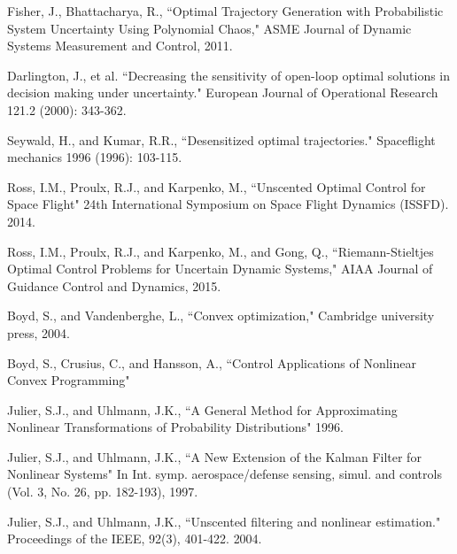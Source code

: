 \documentclass[10pt,a4paper]{article}
\begin{document}
	\begin{thebibliography}{1}
		
		
		 Fisher, J., Bhattacharya, R., ``Optimal Trajectory Generation with Probabilistic System Uncertainty Using Polynomial Chaos," ASME Journal of Dynamic Systems Measurement and Control, 2011.
		
		Darlington, J., et al. ``Decreasing the sensitivity of open-loop optimal solutions in decision making under uncertainty." European Journal of Operational Research 121.2 (2000): 343-362.
		
		Seywald, H., and Kumar, R.R., ``Desensitized optimal trajectories." Spaceflight mechanics 1996 (1996): 103-115.
		
		Ross, I.M., Proulx, R.J., and Karpenko, M., ``Unscented Optimal Control for Space Flight" 24th International Symposium on Space Flight Dynamics (ISSFD). 2014.
		
		Ross, I.M., Proulx, R.J., and Karpenko, M., and Gong, Q., ``Riemann-Stieltjes Optimal Control Problems for Uncertain Dynamic Systems," AIAA Journal of Guidance Control and Dynamics, 2015.
		
		Boyd, S., and Vandenberghe, L., ``Convex optimization," Cambridge university press, 2004.
		
		Boyd, S., Crusius, C., and Hansson, A., ``Control Applications of Nonlinear Convex Programming"
		
		Julier, S.J., and Uhlmann, J.K., ``A General Method for Approximating Nonlinear Transformations of Probability Distributions" 1996.

		Julier, S.J., and Uhlmann, J.K., ``A New Extension of the Kalman Filter for Nonlinear Systems" In Int. symp. aerospace/defense sensing, simul. and controls (Vol. 3, No. 26, pp. 182-193), 1997.
		
		Julier, S.J., and Uhlmann, J.K., ``Unscented filtering and nonlinear estimation." Proceedings of the IEEE, 92(3), 401-422. 2004.
		

\end{thebibliography}
\end{document}
